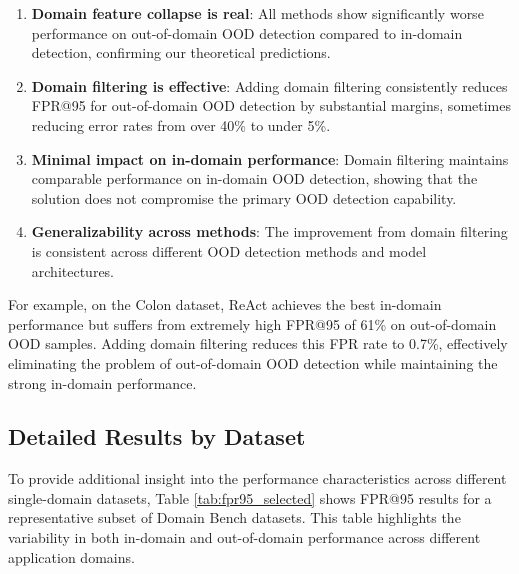 \documentclass[11pt, oneside]{book}
\theoremstyle{plain}
\theoremstyle{definition}
\theoremstyle{remark}
\begin{document}
\begin{enumerate}
\item \textbf{Domain feature collapse is real}: All methods show significantly worse performance on out-of-domain OOD detection compared to in-domain detection, confirming our theoretical predictions.

\item \textbf{Domain filtering is effective}: Adding domain filtering consistently reduces FPR@95 for out-of-domain OOD detection by substantial margins, sometimes reducing error rates from over 40\% to under 5\%.

\item \textbf{Minimal impact on in-domain performance}: Domain filtering maintains comparable performance on in-domain OOD detection, showing that the solution does not compromise the primary OOD detection capability.

\item \textbf{Generalizability across methods}: The improvement from domain filtering is consistent across different OOD detection methods and model architectures.
\end{enumerate}

For example, on the Colon dataset, ReAct achieves the best in-domain performance but suffers from extremely high FPR@95 of 61\% on out-of-domain OOD samples. Adding domain filtering reduces this FPR rate to 0.7\%, effectively eliminating the problem of out-of-domain OOD detection while maintaining the strong in-domain performance.

\subsection{Detailed Results by Dataset}

To provide additional insight into the performance characteristics across different single-domain datasets, Table \ref{tab:fpr95_selected} shows FPR@95 results for a representative subset of Domain Bench datasets. This table highlights the variability in both in-domain and out-of-domain performance across different application domains.
\end{document}
